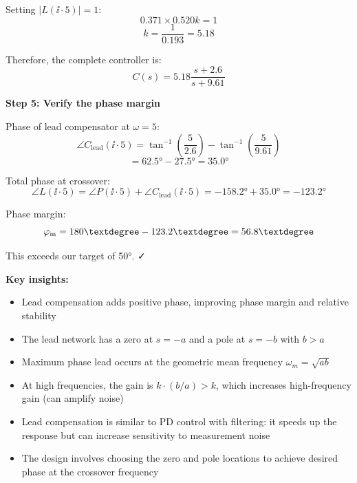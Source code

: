 \documentclass[11pt,a4paper]{article}
\begin{document}
Setting $|L(\ii \cdot 5)| = 1$:
\begin{equation}
  0.371 \times 0.520k = 1
\end{equation}
\begin{equation}
  k = \frac{1}{0.193} = 5.18
\end{equation}

Therefore, the complete controller is:
\begin{equation}
  C(s) = 5.18\frac{s + 2.6}{s + 9.61}
\end{equation}

\textbf{Step 5: Verify the phase margin}

Phase of lead compensator at $\omega = 5$:
\begin{equation}
  \angle C_{\text{lead}}(\ii \cdot 5) = \tan^{-1}\left(\frac{5}{2.6}\right) - \tan^{-1}\left(\frac{5}{9.61}\right)
\end{equation}
\begin{equation}
  = 62.5° - 27.5° = 35.0°
\end{equation}

Total phase at crossover:
\begin{equation}
  \angle L(\ii \cdot 5) = \angle P(\ii \cdot 5) + \angle C_{\text{lead}}(\ii \cdot 5) = -158.2° + 35.0° = -123.2°
\end{equation}

Phase margin:
\begin{equation}
  \phasemargin = 180° - 123.2° = 56.8°
\end{equation}

This exceeds our target of 50°. ✓

\textbf{Key insights:}
\begin{itemize}
  \item Lead compensation adds positive phase, improving phase margin and relative stability
  \item The lead network has a zero at $s = -a$ and a pole at $s = -b$ with $b > a$
  \item Maximum phase lead occurs at the geometric mean frequency $\omega_m = \sqrt{ab}$
  \item At high frequencies, the gain is $k \cdot (b/a) > k$, which increases high-frequency gain (can amplify noise)
  \item Lead compensation is similar to PD control with filtering: it speeds up the response but can increase sensitivity to measurement noise
  \item The design involves choosing the zero and pole locations to achieve desired phase at the crossover frequency
\end{itemize}
\end{document}
